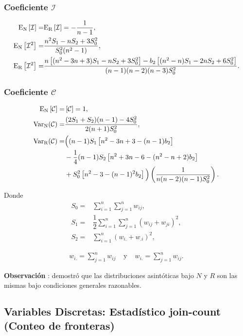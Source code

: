 \subsubsection*{Coeficiente $\mathcal{I}$}
\begin{align}
{\rm{E_N}}\left[\mathcal{I} \right]  = &{\rm{E_R}} \left[\mathcal{I}\right]=-\dfrac{1}{n-1},\\
{\rm{E_N}}\left[\mathcal{I}^2\right] = & \dfrac{n^2S_1-nS_2+3S_0^2}{S_0^2(n^2-1)}, \\
{\rm{E_R}}\left[\mathcal{I}^2\right] = &\dfrac{n \left[ (n^2-3n+3)S_1 - nS_2 + 3S_0^2 \right] - b_2 \left[ (n^2 - n)S_1 - 2nS_2 +6S_0^2\right]}{(n-1)(n-2)(n-3)S_0^2}.
\end{align}

\subsubsection*{Coeficiente $\mathcal{C}$}
\begin{align}
{\rm{E_N}}\left[\mathcal{C}\right] = &\left[\mathcal{C}\right] = 1, \\
{\rm{Var_N}}(\mathcal{C}) =&\dfrac{(2S_1+S_2)(n-1)-4S_0^2}{2(n+1)S_0^2}, \\
{\rm{Var_R}}(\mathcal{C}) =& \Big( (n-1)S_1 \left[ n^2 -3n +3 -(n-1)b_2 \right] \\ \nonumber
   &- \frac{1}{4} (n-1)S_2 \left[ n^2 +3n -6 -(n^2-n+2)b_2 \right] \\ \nonumber
  &+ S_0^2 \left[ n^2 -3 - (n-1)^2 b_2 \right] \Big) \left( \dfrac{1}{n(n-2)(n-1)S_0^2} \right). \nonumber
\end{align}

Donde 
\begin{align}
  S_0 =& \sum_{i=1}^n \sum_{j=1}^n w_{ij}, \\
  S_1 =& \dfrac{1}{2} \sum_{i=1}^n \sum_{j=1}^n  \left( w_{ij}+w_{ji} \right)^2 , \\
  S_2 =& \sum_{i=1}^n  \left( w_{i.}+w_{.i} \right)^2 , 
\end{align}

\begin{eqnarray}
w_{i.} = \sum_{j=1}^n w_{ij} & \mbox{ y } & w_{i.} = \sum_{j=1}^n w_{ij}.
\end{eqnarray}

\textbf{Observación} \label{obs:nrdist}: \citet{hoeffding52} demostró que las distribuciones asintóticas bajo $N$ y $R$ son las mismas bajo condiciones generales razonables. 

\subsection{Variables Discretas: Estadístico join-count (Conteo de fronteras)}\label{subsec:joincountch}

